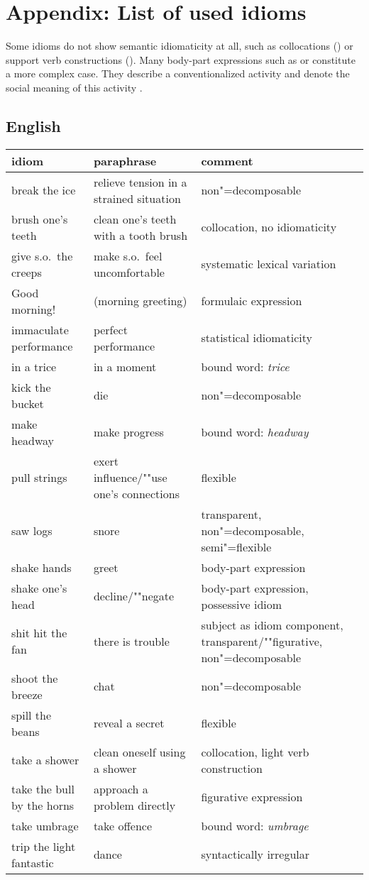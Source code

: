 \documentclass[output=paper
	        ,collection
	        ,collectionchapter
 	        ,biblatex
                ,babelshorthands
                ,newtxmath
                ,draftmode
                ,colorlinks, citecolor=brown
]{langscibook}
\begin{document}
\section*{Appendix: List of used idioms}

Some idioms do not show semantic idiomaticity at all, such as collocations () or support verb constructions (). 
Many body-part expressions such as  or  constitute a more complex case. They describe a conventionalized activity and denote the social meaning of this activity \citep{Burger:76}.

\subsection*{English}

\begin{tabular}{@{}lL{3.8cm}L{3.8cm}@{}}
idiom & paraphrase & comment\\\hline
break the ice      & relieve tension in a strained situation  & non"=decomposable\\
brush one's teeth  & clean one's teeth with a tooth brush     & collocation, no idiomaticity\\
give s.o.\ the creeps & make s.o.\ feel uncomfortable               & systematic lexical variation\\
Good morning!      & (morning greeting)                       & formulaic expression\\
immaculate performance & perfect performance & statistical idiomaticity\\
in a trice & in a moment & bound word: \emph{trice}\\
kick the bucket & die & non"=decomposable\\
make headway & make progress & bound word: \emph{headway}\\
pull strings & exert influence/""use one's connections & flexible\\
saw logs & snore & {transparent, non"=decomposable, semi"=flexible}\\
shake hands & greet & body-part expression\\
shake one's head & decline/""negate & {body-part expression, possessive idiom}\\
shit hit the fan & there is trouble & {subject as idiom component, transparent/""figurative, non"=decomposable}\\
shoot the breeze & chat & non"=decomposable\\
spill the beans & reveal a secret & flexible\\
take a shower & clean oneself using a shower & collocation, light verb construction\\
take the bull by the horns & {approach a problem directly} & figurative expression\\
take umbrage & take offence & bound word: \emph{umbrage}\\
trip the light fantastic & dance & syntactically irregular\\
\end{tabular}
\end{document}
